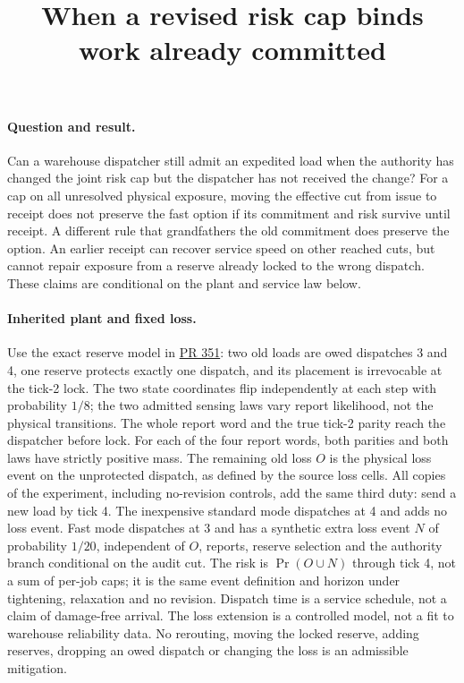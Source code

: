 \documentclass[11pt]{article}
\title{When a revised risk cap binds work already committed}
\author{}
\date{}
\begin{document}
\maketitle

\paragraph{Question and result.}
Can a warehouse dispatcher still admit an expedited load when the authority has changed the joint risk cap but the dispatcher has not received the change? For a cap on all unresolved physical exposure, moving the effective cut from issue to receipt does not preserve the fast option if its commitment and risk survive until receipt. A different rule that grandfathers the old commitment does preserve the option. An earlier receipt can recover service speed on other reached cuts, but cannot repair exposure from a reserve already locked to the wrong dispatch. These claims are conditional on the plant and service law below.

\paragraph{Inherited plant and fixed loss.}
Use the exact reserve model in \href{https://github.com/eternal-november/eos-research-programmes/pull/351}{PR 351}: two old loads are owed dispatches 3 and 4, one reserve protects exactly one dispatch, and its placement is irrevocable at the tick-2 lock. The two state coordinates flip independently at each step with probability $1/8$; the two admitted sensing laws vary report likelihood, not the physical transitions. The whole report word and the true tick-2 parity reach the dispatcher before lock. For each of the four report words, both parities and both laws have strictly positive mass. The remaining old loss $O$ is the physical loss event on the unprotected dispatch, as defined by the source loss cells. All copies of the experiment, including no-revision controls, add the same third duty: send a new load by tick 4. The inexpensive standard mode dispatches at 4 and adds no loss event. Fast mode dispatches at 3 and has a synthetic extra loss event $N$ of probability $1/20$, independent of $O$, reports, reserve selection and the authority branch conditional on the audit cut. The risk is $\Pr(O\cup N)$ through tick 4, not a sum of per-job caps; it is the same event definition and horizon under tightening, relaxation and no revision. Dispatch time is a service schedule, not a claim of damage-free arrival. The loss extension is a controlled model, not a fit to warehouse reliability data. No rerouting, moving the locked reserve, adding reserves, dropping an owed dispatch or changing the loss is an admissible mitigation.
\end{document}
